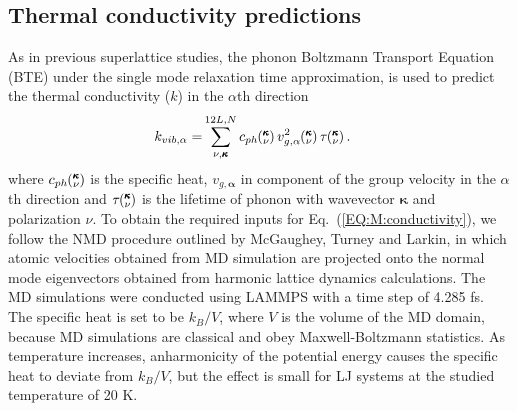 \documentclass[aps,prb,preprint,preprintnumbers,amsmath,amssymb,floatfix,superscriptaddress]{revtex4}
\newcommand{\kv}{\mspace{-4.0mu}\left(\mspace{-8.0mu}
\begin{smallmatrix}&\pmb{\kappa} \\&\nu\end{smallmatrix}
\mspace{-3.0mu}\right)}
\begin{document}
\subsection{Thermal conductivity predictions}\label{SEC:methods}

As in previous superlattice studies, \cite{Luckyanova16112012,doi:10.1021/nl202186y} the phonon Boltzmann Transport Equation (BTE) under the single mode relaxation time approximation,\cite{ziman_electrons_2001} is used to predict the thermal conductivity ($k$) in the $\alpha$th direction
\begin{equation}\label{EQ:M:conductivity}
\begin{split}
k_{vib,\mathbf{\alpha}}=&\sum_{\nu,\pmb{\kappa}}^{12L,N} c_{ph}\kv
v^{2}_{g,\mathbf{\alpha}}\kv \tau\kv.
\end{split}
\end{equation}
where $c_{ph}\kv$ is the specific heat, $v_{g,\mathbf{\alpha}}$ in component of the group velocity in the $\alpha$th direction and $\tau\kv$ is the lifetime of phonon with wavevector $\pmb{\kappa}$ and polarization $\nu$. To obtain the required inputs for Eq.~(\ref{EQ:M:conductivity}), we follow the NMD procedure outlined by McGaughey\cite{PhysRevB.71.184305}, Turney \cite {PhysRevB.81.081411} and Larkin,\cite{jason_inpress} in which atomic velocities obtained from MD simulation are projected onto the normal mode eigenvectors obtained from harmonic lattice dynamics calculations. The MD simulations were conducted using LAMMPS\cite{LAMMPS} with a time step of 4.285 fs. The specific heat is set to be $k_B/V$, where $V$ is the volume of the MD domain, because MD simulations are classical and obey Maxwell-Boltzmann statistics. As temperature increases, anharmonicity of the potential energy causes the specific heat to deviate from $k_B/V$, but the effect is small for LJ systems at the studied temperature of 20 K.\cite{jason_inpress} 
\end{document}

